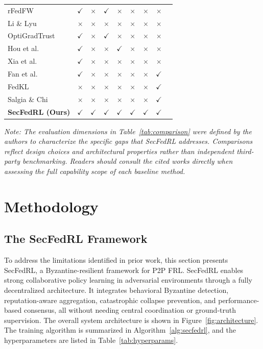 \documentclass[12pt,a4paper]{article}
\newcommand{\yes}{$\checkmark$}
\newcommand{\no}{$\times$}
\begin{document}
\begin{table}[htbp]
{\begin{tabular}{lcccccccc}
rFedFW~\cite{ref18}                 & \yes & \no  & \yes & \no  & \no  & \no  & \no  \\
Li \& Lyu~\cite{ref7}               & \no  & \no  & \no  & \no  & \no  & \no  & \no  \\
OptiGradTrust~\cite{ref1}           & \yes & \no  & \yes & \no  & \no  & \no  & \no  \\
Hou et al.~\cite{ref28}             & \yes & \no  & \no  & \yes & \no  & \no  & \no  \\
Xia et al.~\cite{ref29}             & \yes & \no  & \no  & \no  & \no  & \no  & \no  \\
Fan et al.~\cite{ref15}             & \yes & \no  & \no  & \no  & \no  & \no  & \yes \\
FedKL~\cite{ref17}                  & \no  & \no  & \no  & \no  & \no  & \no  & \yes \\
Salgia \& Chi~\cite{ref30}          & \no  & \no  & \no  & \no  & \no  & \no  & \yes \\
\midrule
\textbf{SecFedRL (Ours)}            & \yes & \yes & \yes & \yes & \yes & \yes & \yes \\
\bottomrule
\end{tabular}%
}
\end{table}

\smallskip\noindent\textit{Note: The evaluation dimensions in Table~\ref{tab:comparison}
were defined by the authors to characterize the specific gaps that SecFedRL addresses.
Comparisons reflect design choices and architectural properties rather than independent
third-party benchmarking. Readers should consult the cited works directly when assessing
the full capability scope of each baseline method.}

\section{Methodology}
\label{sec:methodology}

\subsection*{The SecFedRL Framework}

To address the limitations identified in prior work, this section presents SecFedRL, a
Byzantine-resilient framework for P2P FRL. SecFedRL enables strong collaborative
policy learning in adversarial environments through a fully decentralized architecture.
It integrates behavioral Byzantine detection, reputation-aware aggregation, catastrophic
collapse prevention, and performance-based consensus, all without needing central
coordination or ground-truth supervision. The overall system architecture is shown in
Figure~\ref{fig:architecture}. The training algorithm is summarized in
Algorithm~\ref{alg:secfedrl}, and the hyperparameters are listed in
Table~\ref{tab:hyperparams}.
\end{document}
